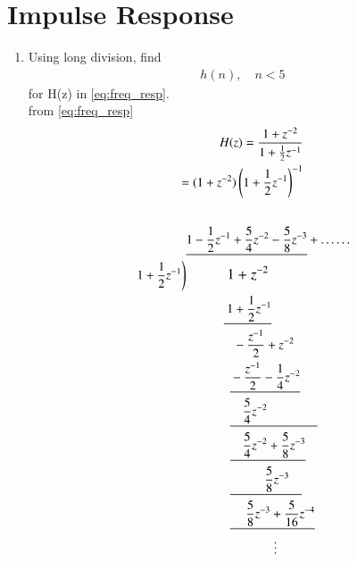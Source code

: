 \documentclass[journal,12pt,twocolumn]{IEEEtran}
\renewcommand\thesection{\arabic{section}}
\begin{document}
	\section{Impulse Response}
	\begin{enumerate}[label=\thesection.\arabic*]
		\item Using long division, 
		find
		\begin{align}
			h(n), \quad n < 5
		\end{align}
		for H(z) in 
		\eqref{eq:freq_resp}.\\
		\solution
		from \eqref{eq:freq_resp}
		\begin{align}
			H(z)= \frac{1 + z^{-2}}{1 + \frac{1}{2}z^{-1}}\\
			= (1 + z^{-2})\brak{1+\frac{1}{2}z^{-1}}^{-1}\\
			\setstackgap{S}{1.5pt}
			\stackMath\def\stackalignment{r}
			\end{align}
		\begin{align*}
			&\underline{1-\dfrac{1}{2}z^{-1}+\dfrac{5}{4}z^{-2}-\dfrac{5}{8}z^{-3}}+\ldots \ldots\\
			\left.1 + \frac{1}{2}z^{-1}\right) &\text{\quad}\text{\quad}\text{\quad}\text{   }\text{\large $1 + z^{-2}$}\\
			&\text{\quad}\text{\quad}\text{\quad}\underline{\text{ }1 + \frac{1}{2}z^{-1}}\\
			&\text{\quad}\text{\quad}\text{\quad}\text{ }\text{ }\text{ }-\frac{z^{-1}}{2}+z^{-2}\\
			&\text{\quad}\text{\quad}\text{\quad}\text{ }\text{ }\underline{\text{} -\frac{z^{-1}}{2} - \frac{1}{4}z^{-2}}\\
			&\text{\quad}\text{\quad}\text{\quad}\text{ }\text{ }\underline{\text{ }\text{ }\text{ }\text{ }\frac{5}{4}z^{-2}\text{\quad \quad \quad \quad}}\\
			&\text{\quad}\text{\quad}\text{\quad}\text{ }\text{ }\underline{\text{ }\text{ }\text{ }\text{ }\frac{5}{4}z^{-2} + \frac{5}{8}z^{-3}}\\
			&\text{\quad}\text{\quad}\text{\quad}\text{ }\text{ }\underline{\text{ }\text{ }\text{ }\text{\quad}\text{\quad}\frac{5}{8}z^{-3}\text{\quad}}\\
			&\text{\quad}\text{\quad}\text{\quad}\text{ }\text{ }\underline{\text{ }\text{ }\text{ }\text{ }\text{ }\frac{5}{8}z^{-3} + \frac{5}{16}z^{-4}}\\
			&\text{\quad}\text{\quad}\text{\quad}\text{\quad}\text{\quad}\text{\quad}\text{\quad}\vdots
		\end{align*}


\end{enumerate}
\end{document}

